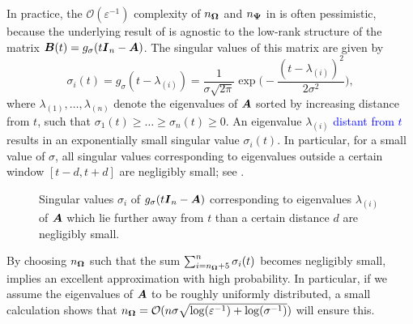 In practice, the $\mathcal{O}(\varepsilon^{-1})$ complexity of $n_{\boldsymbol{\Omega}}$ and $n_{\boldsymbol{\Psi}}$ in  is often pessimistic, because  the underlying result of  is agnostic to the low-rank structure of the matrix $\boldsymbol{B}(t) = g_{\sigma}(t\boldsymbol{I}_n - \boldsymbol{A})$. The singular values of this matrix are given by
\begin{equation*}
    \sigma_i(t) = g_{\sigma}(t - \lambda_{(i)}) = \frac{1}{\sigma\sqrt{2 \pi}} \exp\Big( -\frac{(t - \lambda_{(i)})^2}{2 \sigma^2} \Big),  
    \label{equ:gaussian-kernel-eigenvalues}
\end{equation*}
where $\lambda_{(1)}, \dots, \lambda_{(n)}$ denote the eigenvalues of $\boldsymbol{A}$ sorted by increasing distance from $t$, such that $\sigma_1(t) \geq \dots \geq \sigma_n(t) \ge 0$. An eigenvalue $\lambda_{(i)}$ \textcolor{blue}{distant from $t$} results in an exponentially small singular value $\sigma_i(t)$. In particular, for a small value of $\sigma$, all singular values corresponding to eigenvalues outside a certain window $[t - d, t + d]$ are negligibly small; see .
\begin{figure}[ht]
    \centering
    
    \caption{Singular values $\sigma_i$ of $g_{\sigma}(t\boldsymbol{I}_n - \boldsymbol{A})$ corresponding to eigenvalues $\lambda_{(i)}$ of $\boldsymbol{A}$ which lie further away from $t$ than a certain distance $d$ are negligibly small.}
    \label{fig:numerical-rank}
\end{figure}
By choosing $n_{\boldsymbol{\Omega}}$ such that the sum $\sum_{i=n_{\boldsymbol{\Omega}}+5}^{n} \sigma_i(t)$ becomes negligibly small,   implies an excellent approximation with high probability. In particular, if we assume the eigenvalues of $\boldsymbol{A}$ to be roughly uniformly distributed, a small calculation shows that $n_{\boldsymbol{\Omega}} = \mathcal{O}(n \sigma \sqrt{\log(\varepsilon^{-1}) + \log(\sigma^{-1})})$ will ensure this.

